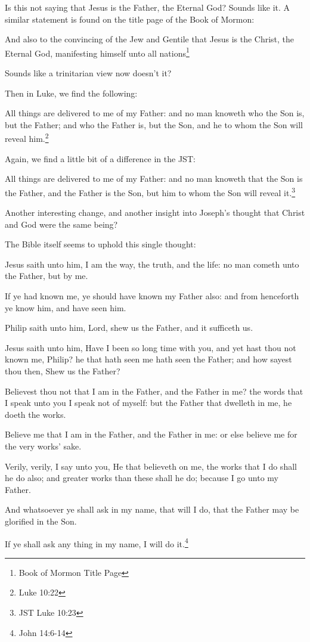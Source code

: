 Is this not saying that Jesus is the Father, the Eternal God? Sounds like it. A
similar statement is found on the title page of the Book of Mormon:

\begin{displayquote}
And also to the convincing of the Jew and Gentile that Jesus is the Christ, 
the Eternal God, manifesting himself unto all nations\footnote{Book of Mormon 
Title Page}
\end{displayquote}

Sounds like a trinitarian view now doesn't it?

Then in Luke, we find the following:

\begin{displayquote}
All things are delivered to me of my Father: and no man knoweth who the Son is, but 
the Father; and who the Father is, but the Son, and he to whom the Son will reveal 
him.\footnote{Luke 10:22}
\end{displayquote}

Again, we find a little bit of a difference in the JST:

\begin{displayquote}
All things are delivered to me of my Father: and no man knoweth that the Son is the 
Father, and the Father is the Son, but him to whom the Son will reveal 
it.\footnote{JST Luke 10:23}
\end{displayquote}

Another interesting change, and another insight into Joseph's thought that Christ and
God were the same being?

The Bible itself seems to uphold this single thought:

\begin{displayquote}
Jesus saith unto him, I am the way, the truth, and the life: no man cometh unto the 
Father, but by me.

If ye had known me, ye should have known my Father also: and from henceforth ye 
know him, and have seen him.

Philip saith unto him, Lord, shew us the Father, and it sufficeth us.

Jesus saith unto him, Have I been so long time with you, and yet hast thou not 
known me, Philip? he that hath seen me hath seen the Father; and how sayest thou 
then, Shew us the Father?

Believest thou not that I am in the Father, and the Father in me? the words that I 
speak unto you I speak not of myself: but the Father that dwelleth in me, he doeth 
the works.

Believe me that I am in the Father, and the Father in me: or else believe me for 
the very works’ sake.

Verily, verily, I say unto you, He that believeth on me, the works that I do shall 
he do also; and greater works than these shall he do; because I go unto my Father.

And whatsoever ye shall ask in my name, that will I do, that the Father may be 
glorified in the Son.

If ye shall ask any thing in my name, I will do it.\footnote{John 14:6-14}
\end{displayquote}